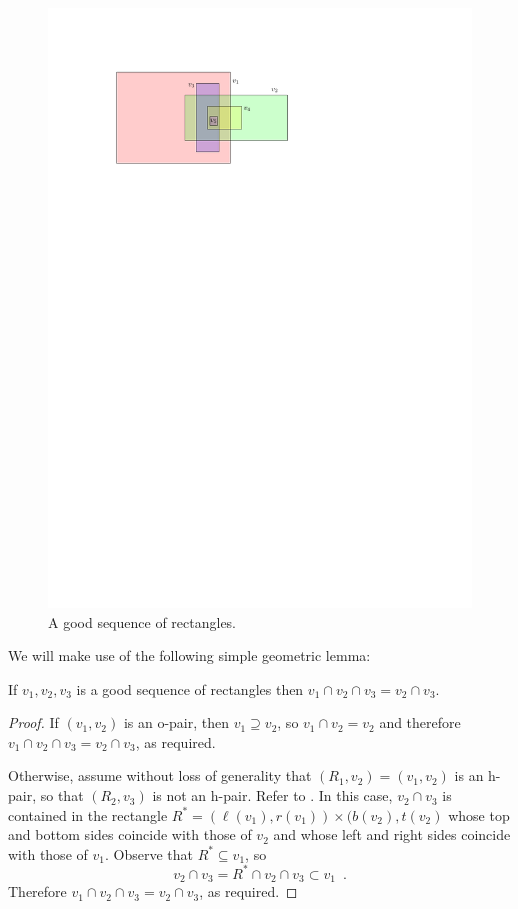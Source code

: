 \documentclass[lotsofwhite]{patmorin}
\begin{document}
\begin{figure}
  \begin{center}
    \includegraphics{figs/good-sequence}
  \end{center}
  \caption{A good sequence of rectangles.}
\end{figure}

We will make use of the following simple geometric lemma:
\begin{lem}
  If $v_1,v_2,v_3$ is a good sequence of rectangles then
  $v_1\cap v_2\cap v_3=v_2\cap v_3$.
\end{lem}


\begin{proof}
  If $(v_1,v_2)$ is an o-pair, then $v_1\supseteq v_2$, so $v_1\cap v_2 =
  v_2$ and therefore $v_1\cap v_2\cap v_3=v_2\cap v_3$, as required.

  Otherwise, assume without loss of generality that $(R_1,v_2)=(v_1,v_2)$
  is an h-pair, so that $(R_2,v_3)$ is not an h-pair. Refer to
  .  In this case, $v_2\cap v_3$ is contained in the
  rectangle $R^*=(\ell(v_1),r(v_1))\times (b(v_2),t(v_2)$ whose top and
  bottom sides coincide with those of $v_2$ and whose left and right
  sides coincide with those of $v_1$. Observe that $R^*\subseteq v_1$, so
  \[
   v_2\cap v_3 = R^* \cap v_2\cap v_3 \subset v_1 \enspace .
  \]
  Therefore $v_1\cap v_2\cap v_3=v_2\cap v_3$, as required.
\end{proof}
\end{document}
